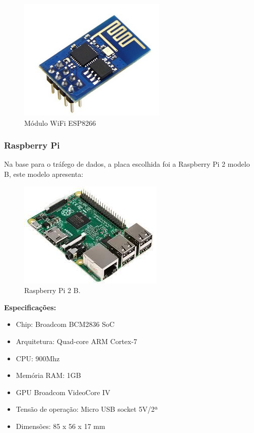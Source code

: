   \begin{figure}[H]                                      
    \centering                                           
    \includegraphics[scale=0.8]{figuras/modulo_wifi.png}
    \caption{Módulo WiFi ESP8266}                              
    \label{img:modulo_wifi}                             
  \end{figure}                                           

  \subsubsection{Raspberry Pi}
  \label{sub:Raspberry}
    Na base para o tráfego de dados, a placa escolhida foi a Raspberry Pi 2 modelo B, este modelo apresenta:

  \begin{figure}[H]                                      
    \centering                                           
    \includegraphics[scale=0.8]{figuras/rasp.jpg} 
    \caption{Raspberry Pi 2 B.}                        
    \label{img:Rasp}                              
  \end{figure}                                           

  \textbf{Especificações:}
  \begin{itemize}                                                     
    \item Chip: Broadcom BCM2836 SoC
    \item Arquitetura: Quad-core ARM Cortex-7
    \item CPU: 900Mhz
    \item Memória RAM: 1GB
    \item GPU Broadcom VideoCore IV
    \item Tensão de operação: Micro USB socket 5V/2ª
    \item Dimensões: 85 x 56 x 17 mm
 \end{itemize}                                                       
  
